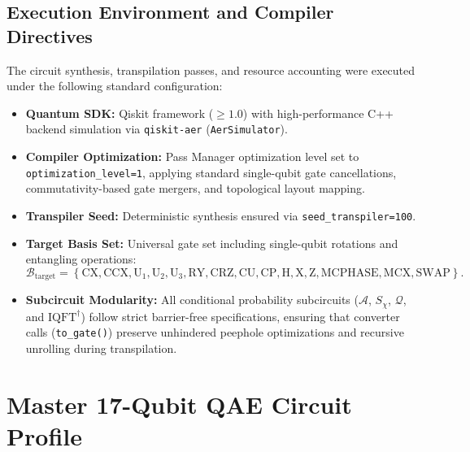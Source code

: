 \subsection{Execution Environment and Compiler Directives}
The circuit synthesis, transpilation passes, and resource accounting were executed under the following standard configuration:
\begin{itemize}[leftmargin=*]
    \item \textbf{Quantum SDK:} Qiskit framework ($\ge 1.0$) with high-performance C++ backend simulation via \texttt{qiskit-aer} (\texttt{AerSimulator}).
    \item \textbf{Compiler Optimization:} Pass Manager optimization level set to \texttt{optimization\_level=1}, applying standard single-qubit gate cancellations, commutativity-based gate mergers, and topological layout mapping.
    \item \textbf{Transpiler Seed:} Deterministic synthesis ensured via \texttt{seed\_transpiler=100}.
    \item \textbf{Target Basis Set:} Universal gate set including single-qubit rotations and entangling operations:
    \begin{equation}
    \mathcal{B}_{\mathrm{target}} = \left\{ \mathrm{CX}, \mathrm{CCX}, \mathrm{U}_1, \mathrm{U}_2, \mathrm{U}_3, \mathrm{RY}, \mathrm{CRZ}, \mathrm{CU}, \mathrm{CP}, \mathrm{H}, \mathrm{X}, \mathrm{Z}, \mathrm{MCPHASE}, \mathrm{MCX}, \mathrm{SWAP} \right\}.
    \end{equation}
    \item \textbf{Subcircuit Modularity:} All conditional probability subcircuits ($\mathcal{A}$, $S_\chi$, $\mathcal{Q}$, and $\mathrm{IQFT}^\dagger$) follow strict barrier-free specifications, ensuring that converter calls (\texttt{to\_gate()}) preserve unhindered peephole optimizations and recursive unrolling during transpilation.
\end{itemize}

\section{Master 17-Qubit QAE Circuit Profile}\label{sec:app_master_qae_profile}

